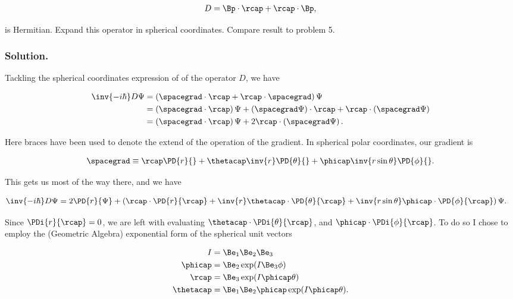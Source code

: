 \begin{align*}
D = \Bp \cdot \rcap + \rcap \cdot \Bp,
\end{align*}

is Hermitian.  Expand this operator in spherical coordinates.  Compare result to problem 5.

\subsubsection{Solution.}

Tackling the spherical coordinates expression of of the operator $D$, we have

\begin{align*}
\inv{-i\hbar} D \Psi 
&= \left( \spacegrad \cdot \rcap + \rcap \cdot \spacegrad \right) \Psi \\
&= 
\left( \spacegrad \cdot \rcap \right) \Psi 
+ \left( \spacegrad \Psi \right) \cdot \rcap 
+ \rcap \cdot \left(\spacegrad \Psi\right) \\
&=
\left( \spacegrad \cdot \rcap \right) \Psi 
+ 2 \rcap \cdot \left( \spacegrad \Psi \right).
\end{align*}

Here braces have been used to denote the extend of the operation of the gradient.  In spherical polar coordinates, our gradient is

\begin{align*}
\spacegrad \equiv 
\rcap \PD{r}{}
+\thetacap \inv{r} \PD{\theta}{}
+\phicap \inv{r \sin\theta} \PD{\phi}{}.
\end{align*}

This gets us most of the way there, and we have

\begin{align*}
\inv{-i\hbar} D \Psi 
&=
2 \PD{r}{\Psi} 
+ 
\left( 
\rcap \cdot \PD{r}{\rcap}
+\inv{r} \thetacap \cdot \PD{\theta}{\rcap}
+\inv{r \sin\theta} \phicap \cdot \PD{\phi}{\rcap}
\right) \Psi.
\end{align*}

Since $\PDi{r}{\rcap} = 0$, we are left with evaluating $\thetacap \cdot \PDi{\theta}{\rcap}$, and $\phicap \cdot \PDi{\phi}{\rcap}$.  To do so I chose to employ the (Geometric Algebra) exponential form of the spherical unit vectors \cite{sphericalPolarUnit}

\begin{align*}
I &= \Be_1 \Be_2 \Be_3 \\
\phicap &= \Be_{2} \exp( I \Be_3 \phi ) \\
\rcap &= \Be_3 \exp( I \phicap \theta ) \\
\thetacap &= \Be_1 \Be_2 \phicap \exp( I \phicap \theta ).
\end{align*}

